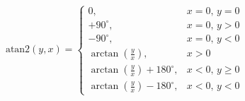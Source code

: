 \documentclass[preview]{standalone}
\begin{document}
\begin{align*}
\text{atan2}(y, x) = \begin{cases} 0, & x = 0,\, y = 0 \\+90^\circ, & x = 0,\, y > 0 \\-90^\circ, & x = 0,\, y < 0 \\\arctan\left(\frac{y}{x}\right), & x > 0 \\\arctan\left(\frac{y}{x}\right) + 180^\circ, & x < 0,\, y \geq 0 \\\arctan\left(\frac{y}{x}\right) - 180^\circ, & x < 0,\, y < 0 \end{cases}
\end{align*}
\end{document}
